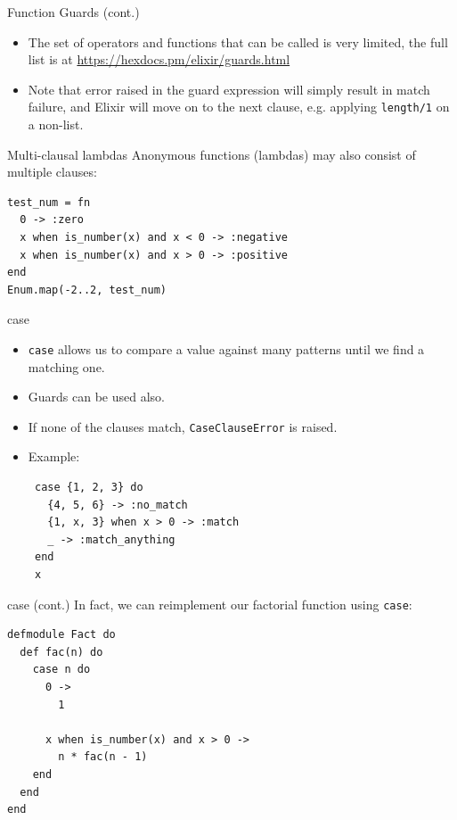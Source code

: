 \documentclass[12pt]{beamer}
\begin{document}
\begin{frame}{Function Guards (cont.)}
  \begin{itemize}
    \item The set of operators and functions that can be called is very limited, the full list is at \url{https://hexdocs.pm/elixir/guards.html}
    \item Note that error raised in the guard expression will simply result in match failure, and Elixir will move on to the next clause, e.g. applying \texttt{length/1} on a non-list.
  \end{itemize}
\end{frame}

\begin{frame}[fragile]{Multi-clausal lambdas}
  Anonymous functions (lambdas) may also consist of multiple clauses:
  \begin{verbatim}
test_num = fn
  0 -> :zero
  x when is_number(x) and x < 0 -> :negative
  x when is_number(x) and x > 0 -> :positive
end
Enum.map(-2..2, test_num)
 \end{verbatim}
\end{frame}

\begin{frame}[fragile]{case}
  \begin{itemize}
    \item \texttt{case} allows us to compare a value against many patterns until we find a matching one.
    \item Guards can be used also.
    \item If none of the clauses match, \texttt{CaseClauseError} is raised.
    \item Example:
          \begin{verbatim}
 case {1, 2, 3} do
   {4, 5, 6} -> :no_match
   {1, x, 3} when x > 0 -> :match
   _ -> :match_anything
 end
 x
 \end{verbatim}
  \end{itemize}
\end{frame}

\begin{frame}[fragile]{case (cont.)}
  In fact, we can reimplement our factorial function using \texttt{case}:
  \begin{verbatim}
defmodule Fact do
  def fac(n) do
    case n do
      0 ->
        1

      x when is_number(x) and x > 0 ->
        n * fac(n - 1)
    end
  end
end
 \end{verbatim}
\end{frame}
\end{document}
